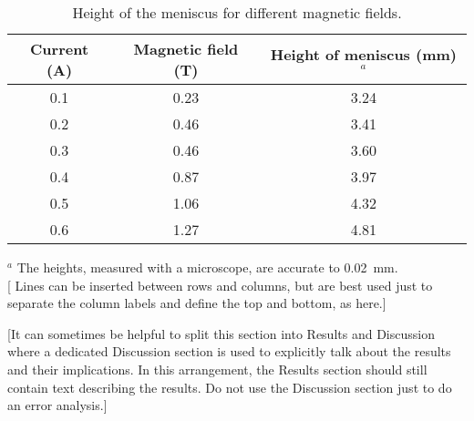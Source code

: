 \documentclass[11pt]{article} %
\begin{document}
\begin{table} %

\begin{center}
\caption{Height of the meniscus for different magnetic fields.}
\label{tab:example}
\begin{tabular}{ccc}\hline %
Current (A) & Magnetic field (T) & Height of meniscus (mm)$^a$\\ \hline %
0.1 & 0.23  & 3.24\\
0.2 & 0.46  & 3.41\\ 
0.3 & 0.46  & 3.60\\ 
0.4 & 0.87  & 3.97\\ 
0.5 & 1.06  & 4.32\\ 
0.6 & 1.27  & 4.81\\ \hline
\end{tabular} %
\smallskip %

$^a$ The heights, measured with a microscope, are accurate to 0.02~mm. \\
\smallskip %
{\color{blue}
[ Lines can be inserted between rows and columns, but are best used just to separate the column labels and define the top and bottom, as here.]}

\end{center}
\end{table}


{\color{blue}
 [It can sometimes be helpful to split this section into Results and Discussion where a dedicated Discussion section is used to explicitly talk about the results and their implications. In this arrangement, the Results section should still contain text describing the results. Do not use the Discussion section just to do an error analysis.]}\\
\end{document}
